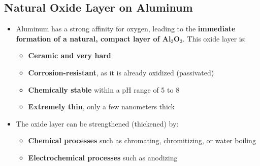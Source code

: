 \documentclass{article}
\begin{document}
\subsection{Natural Oxide Layer on Aluminum}
\begin{itemize}
  \item Aluminum has a strong affinity for oxygen, leading to the \textbf{immediate formation of a natural, compact layer of Al$_2$O$_3$}. This oxide layer is:
  \begin{itemize}
    \item \textbf{Ceramic and very hard}
    \item \textbf{Corrosion-resistant}, as it is already oxidized (passivated)
    \item \textbf{Chemically stable} within a pH range of 5 to 8
    \item \textbf{Extremely thin}, only a few nanometers thick
  \end{itemize}
  \item The oxide layer can be strengthened (thickened) by:
  \begin{itemize}
    \item \textbf{Chemical processes} such as chromating, chromitizing, or water boiling
    \item \textbf{Electrochemical processes} such as anodizing
  \end{itemize}
\end{itemize}

\newpage
\end{document}
